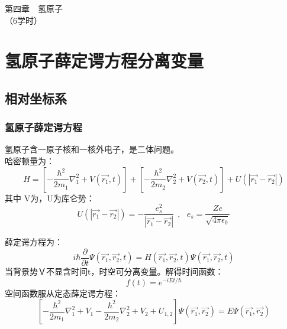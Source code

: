 \begin{frame}
		\frametitle{}
	    \begin{center}
		{ {\Huge 第四章~~氢原子  \\（6学时）}}
	    \end{center}    
\end{frame}
\section{氢原子薛定谔方程分离变量 }

\subsection{相对坐标系}

\begin{frame}
	\frametitle{氢原子薛定谔方程}
	氢原子含一原子核和一核外电子，是二体问题。\\
	哈密顿量为：
	\begin{equation*}
		H=\left[-\frac{\hbar^2}{2 m_1} \nabla_1 ^2 + V(\vec{r_1},t) \right]  + \left[-\frac{\hbar^2}{2 m_2} \nabla_2 ^2 + V(\vec{r_2},t) \right]  +U(| \vec{r_1}-\vec{r_2} | )
	\end{equation*}
	其中 V为，U为库仑势：
	\begin{equation*}
		U(| \vec{r_1}-\vec{r_2} | )=-\frac{e_s ^2}{| \vec{r_1}-\vec{r_2} |} ~~,~~~ e_s =\frac{Ze}{\sqrt{4\pi\epsilon_0}}
	\end{equation*}
\end{frame}

\begin{frame}
	薛定谔方程为：
	\begin{equation*}
		i\hbar \frac{\partial }{\partial t} \Psi (\vec{r_1},\vec{r_2},t ) =H (\vec{r_1},\vec{r_2}, t  )  \Psi (\vec{r_1},\vec{r_2},t ) 
	\end{equation*}
	当背景势Ｖ不显含时间t，时空可分离变量。解得时间函数：
	\begin{equation*}
		f(t) =e^{-iEt/\hbar}
	\end{equation*}
	空间函数服从定态薛定谔方程：
	\begin{equation*}
		\left[-\frac{\hbar^2}{2 m_1} \nabla_1 ^2 + V_1  -\frac{\hbar^2}{2 m_2} \nabla_2 ^2 + V_2  +U_{1,2} \right] \Psi (\vec{r_1},\vec{r_2}) =E \Psi (\vec{r_1},\vec{r_2}) 
	\end{equation*}
\end{frame}		

